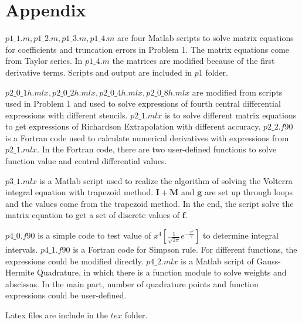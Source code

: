 \documentclass[letterpaper,10pt]{article}
\begin{document}
\section{Appendix}
$p1\_1.m,p1\_2.m,p1\_3.m,p1\_4.m$ are four Matlab scripts to solve matrix equations for coefficients and truncation errors in Problem 1. 
The matrix equations come from Taylor series. In $p1\_4.m$ the matrices are modified because of the first derivative terms. 
Scripts and output are included in $p1$ folder. 

$p2\_0\_1h.mlx,p2\_0\_2h.mlx,p2\_0\_4h.mlx,p2\_0\_8h.mlx$ are modified from scripts used in Problem 1 and used to 
solve expressions of fourth central differential expressions with different stencils. $p2\_1.mlx$ is to solve different 
matrix equations to get expressions of Richardson Extrapolation with different accuracy. $p2\_2.f90$ is a Fortran code 
used to calculate numerical derivatives with expressions from $p2\_1.mlx$. In the Fortran code, there are two user-defined functions 
to solve function value and central differential values. 

$p3\_1.mlx$ is a Matlab script used to realize the algorithm of solving the Volterra integral equation with trapezoid method. 
$\bm{I}+\bm{M}$ and $\bm{g}$ are set up through loops and the values come from the trapezoid method. In the end, the script 
solve the matrix equation to get a set of discrete values of $\bm{f}$. 

$p4\_0.f90$ is a simple code to test value of $x^4 \left[\frac{1}{\sqrt{2\pi}}e^{-\frac{x^2}{2}}\right]$ to determine integral intervals. 
$p4\_1.f90$ is a Fortran code for Simpson rule. For different functions, the expressions could be modified directly. 
$p4\_2.mlx$ is a Matlab script of Gauss-Hermite Quadrature, in which there is a function module to solve weights and abscissas. 
In the main part, number of quadrature points and function expressions could be user-defined. 

Latex files are include in the $tex$ folder. 
\end{document}
